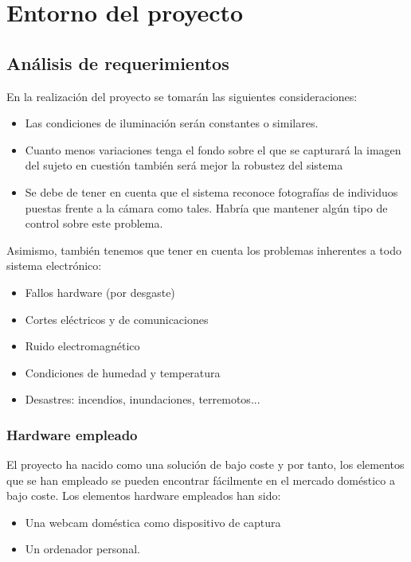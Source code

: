 \chapter{Entorno del proyecto}

\section{Análisis de requerimientos}
En la realización del proyecto se tomarán las siguientes consideraciones:
\begin{itemize}
	\item{Las condiciones de iluminación serán constantes o similares.}
	\item{Cuanto menos variaciones tenga el fondo sobre el que se capturará la imagen del sujeto en cuestión también será mejor la robustez del sistema}
	\item{Se debe de tener en cuenta que el sistema reconoce fotografías de individuos puestas frente a la cámara como tales. Habría que mantener algún tipo de control sobre este problema.}
\end{itemize}
	
Asimismo, también tenemos que tener en cuenta los problemas inherentes a todo sistema electrónico:
\begin{itemize}
	\item{Fallos hardware (por desgaste)}
	\item{Cortes eléctricos y de comunicaciones}
	\item{Ruido electromagnético}
	\item{Condiciones de humedad y temperatura}
	\item{Desastres: incendios, inundaciones, terremotos...}
\end{itemize}

\subsection{Hardware empleado}
El proyecto ha nacido como una solución de bajo coste y por tanto, los elementos que se han empleado se pueden encontrar fácilmente en el mercado doméstico a bajo coste. Los elementos hardware empleados han sido:
\begin{itemize}
	\item{Una webcam doméstica como dispositivo de captura}
	\item{Un ordenador personal.}
\end{itemize}

